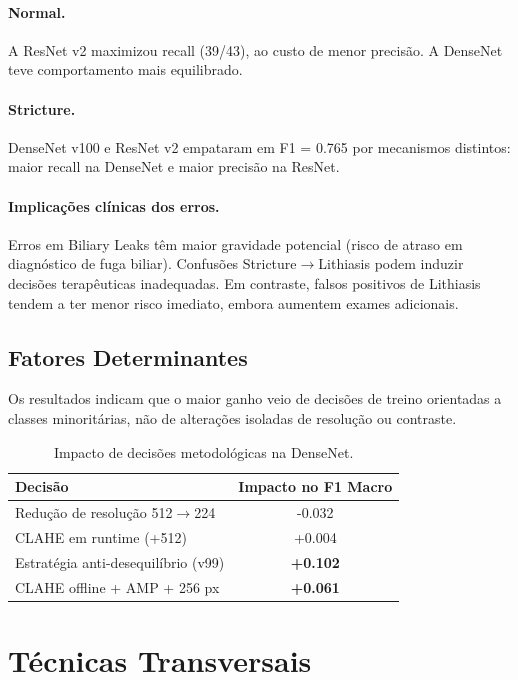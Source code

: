 \documentclass[runningheads]{llncs}
\begin{document}
\paragraph{Normal.}
A ResNet v2 maximizou recall (39/43), ao custo de menor precisão. A DenseNet
teve comportamento mais equilibrado.

\paragraph{Stricture.}
DenseNet v100 e ResNet v2 empataram em F1 = 0.765 por mecanismos distintos:
maior recall na DenseNet e maior precisão na ResNet.

\paragraph{Implicações clínicas dos erros.}
Erros em Biliary Leaks têm maior gravidade potencial (risco de atraso em
diagnóstico de fuga biliar). Confusões Stricture\(\rightarrow\)Lithiasis podem
induzir decisões terapêuticas inadequadas. Em contraste, falsos positivos de
Lithiasis tendem a ter menor risco imediato, embora aumentem exames adicionais.

\subsection{Fatores Determinantes}
Os resultados indicam que o maior ganho veio de decisões de treino orientadas a
classes minoritárias, não de alterações isoladas de resolução ou contraste.

\begin{table}[ht]
\caption{Impacto de decisões metodológicas na DenseNet.}
\label{tab:impact_dense}
\centering
\begin{tabular}{lc}
\hline
Decisão & Impacto no F1 Macro \\
\hline
Redução de resolução 512\(\rightarrow\)224 & -0.032 \\
CLAHE em runtime (+512) & +0.004 \\
Estratégia anti-desequilíbrio (v99) & \textbf{+0.102} \\
CLAHE offline + AMP + 256 px & \textbf{+0.061} \\
\hline
\end{tabular}
\end{table}

\section{Técnicas Transversais}
\end{document}
